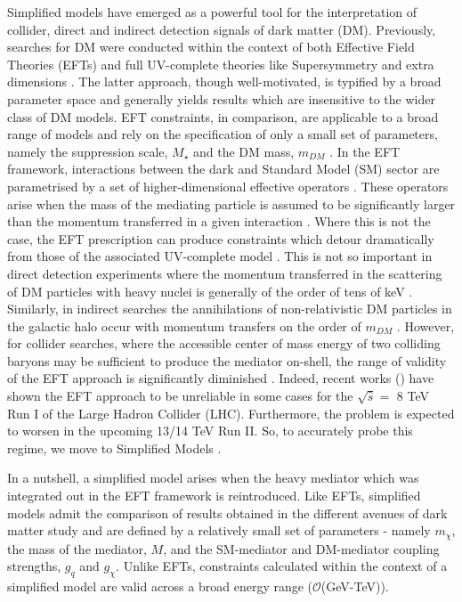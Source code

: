 Simplified models have emerged as a powerful tool for the interpretation of collider, direct and indirect detection signals of dark matter (DM). Previously,  searches for DM were conducted within the context of both Effective Field Theories (EFTs) \cite{Aad:1363019, ATLAS-CONF-2012-147, CMS-PAS-EXO-12-048, Buckley:2013jwa, Abdallah:1472683, MonoZ, MonoX} and full UV-complete theories like Supersymmetry \cite{ComppMSSM, Aad:2012ms, Aad:2012fqa, Aad:2014wea, SUSY_official_paper} and extra dimensions \cite{}. The latter approach, though well-motivated, is typified by a broad parameter space and generally yields results which are insensitive to the wider class of DM models. EFT constraints, in comparison, are applicable to a broad range of models and rely on the specification of only a small set of parameters, namely the suppression scale, $M_{\star}$ and the DM mass, $m_{DM}$ \cite{}. 
In the EFT framework, interactions between the dark and Standard Model (SM) sector are parametrised by a set of higher-dimensional effective operators \cite{}. These operators arise when the mass of the mediating particle is assumed to be significantly larger than the momentum transferred in a given interaction \cite{}. Where this is not the case, the EFT prescription can produce constraints which detour dramatically from those of the associated UV-complete model \cite{Bai:2010hh, DMCons2, Fox:2011fx, Graesser:2011vj, An:2011ck}. This is not so important in direct detection experiments where the momentum transferred in the scattering of DM particles with heavy nuclei is generally of the order of tens of keV \cite{EFTDM, DMCons3}. Similarly, in indirect searches the annihilations of non-relativistic DM particles in the galactic halo occur with momentum transfers on the order of $m_{DM}$ \cite{}. However, for collider searches, where the accessible center of mass energy of two colliding baryons may be sufficient to produce the mediator on-shell, the range of validity of the EFT approach is significantly diminished \cite{}. Indeed, recent works (\cite{}) have shown the EFT approach to be unreliable in some cases for the $\sqrt{\hat{s}} =$ 8 TeV Run I of the Large Hadron Collider (LHC). Furthermore, the problem is expected to worsen in the upcoming 13/14 TeV Run II. So, to accurately probe this regime, we move to Simplified Models \cite{Buchmueller:2014yoa}.

In a nutshell, a simplified model arises when the heavy mediator which was integrated out in the EFT framework is reintroduced. Like EFTs, simplified models admit the comparison of results obtained in the different avenues of dark matter study \cite{} and are defined by a relatively small set of parameters - namely $m_\chi$, the mass of the mediator, $M$, and the SM-mediator and DM-mediator coupling strengths, $g_{q}$ and $g_\chi$. Unlike EFTs, constraints calculated within the context of a simplified model are valid across a broad energy range ($\mathcal{O}$(GeV-TeV)).

